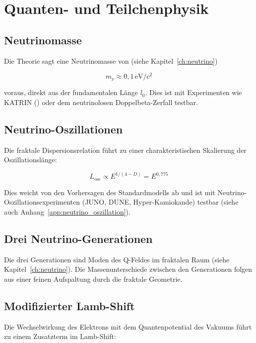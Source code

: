 \section{Quanten- und Teilchenphysik}
\label{sec:vorh_quanten}

\subsection{Neutrinomasse}
\label{sub:vorh_neutrinomasse}

Die Theorie sagt eine Neutrinomasse von (siehe Kapitel~\ref{ch:neutrino})

\[
m_\nu \approx 0,1 \, \text{eV}/c^2
\]

voraus, direkt aus der fundamentalen Länge \( l_0 \). Dies ist mit Experimenten wie KATRIN (\cite{KATRIN2022}) oder dem neutrinolosen Doppelbeta-Zerfall testbar.

\subsection{Neutrino-Oszillationen}
\label{sub:vorh_neutrino_osz}

Die fraktale Dispersionsrelation führt zu einer charakteristischen Skalierung der Oszillationslänge:

\[
L_{\text{osc}} \propto E^{1/(4-D)} = E^{0,775}
\]

Dies weicht von den Vorhersagen des Standardmodells ab und ist mit Neutrino-Oszillationsexperimenten (JUNO, DUNE, Hyper-Kamiokande) testbar (siehe auch Anhang~\ref{app:neutrino_oszillation}).

\subsection{Drei Neutrino-Generationen}
\label{sub:vorh_drei_generationen}

Die drei Generationen sind Moden des Q-Feldes im fraktalen Raum (siehe Kapitel~\ref{ch:neutrino}). Die Massenunterschiede zwischen den Generationen folgen aus einer feinen Aufspaltung durch die fraktale Geometrie.

\subsection{Modifizierter Lamb-Shift}
\label{sub:vorh_lamb_shift}

Die Wechselwirkung des Elektrons mit dem Quantenpotential des Vakuums führt zu einem Zusatzterm im Lamb-Shift:

